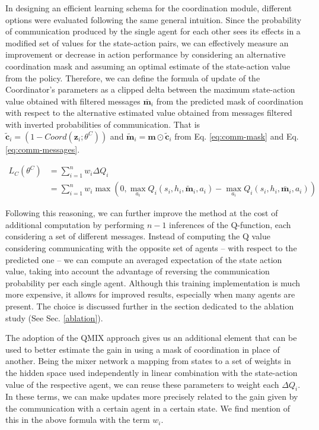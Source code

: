 \documentclass[a4paper,singleside,12pt]{report} %
\begin{document}
In designing an efficient learning schema for the coordination module, different options were evaluated following the same general intuition. Since the probability of communication produced by the single agent for each other sees its effects in a modified set of values for the state-action pairs, we can effectively measure an improvement or decrease in action performance by considering an alternative coordination mask and assuming an optimal estimate of the state-action value from the policy. Therefore, we can define the formula of update of the Coordinator's parameters as a clipped delta between the maximum state-action value obtained with filtered messages \(\bar{\textbf{m}}_i\) from the predicted mask of coordination with respect to the alternative estimated value obtained from messages filtered with inverted probabilities of communication. That is $\tilde{\textbf{c}}_i = (1- Coord(\textbf{z}_i; \theta^C))$ and $\tilde{\textbf{m}}_i = \textbf{m} \odot \tilde{\textbf{c}}_i$ from Eq. \ref{eq:comm-mask} and Eq. \ref{eq:comm-messages}.

  \begin{equation}
    \begin{split}
    L_C(\theta^C) &= \sum^n_{i=1} w_i \Delta Q_i
    \\
    &=\sum^n_{i=1} w_i \max(0,\max_{a_i}Q_i(s_i,h_i,\tilde{\textbf{m}}_i,a_i) - \max_{a_i}Q_i(s_i,h_i,\bar{\textbf{m}}_i,a_i))
    \end{split}
  \end{equation}

Following this reasoning, we can further improve the method at the cost of additional computation by performing $n-1$ inferences of the Q-function, each considering a set of different messages. Instead of computing the Q value considering communicating with the opposite set of agents -- with respect to the predicted one -- we can compute an averaged expectation of the state action value, taking into account the advantage of reversing the communication probability per each single agent. Although this training implementation is much more expensive, it allows for improved results, especially when many agents are present. The choice is discussed further in the section dedicated to the ablation study (See Sec. \ref{ablation}).

The adoption of the QMIX approach gives us an additional element that can be used to better estimate the gain in using a mask of coordination in place of another. Being the mixer network a mapping from states to a set of weights in the hidden space used independently in linear combination with the state-action value of the respective agent, we can reuse these parameters to weight each \(\Delta Q_i\). In these terms, we can make updates more precisely related to the gain given by the communication with a certain agent in a certain state. We find mention of this in the above formula with the term \(w_i\).
\end{document}
